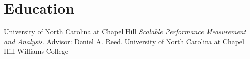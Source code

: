 \section{Education}
		{University of North Carolina at Chapel Hill}{}{}
		{\textit{Scalable Performance Measurement and Analysis}. Advisor: Daniel A. Reed.}
		{University of North Carolina at Chapel Hill}{}{}{}
		{Williams College}{}{}{}

